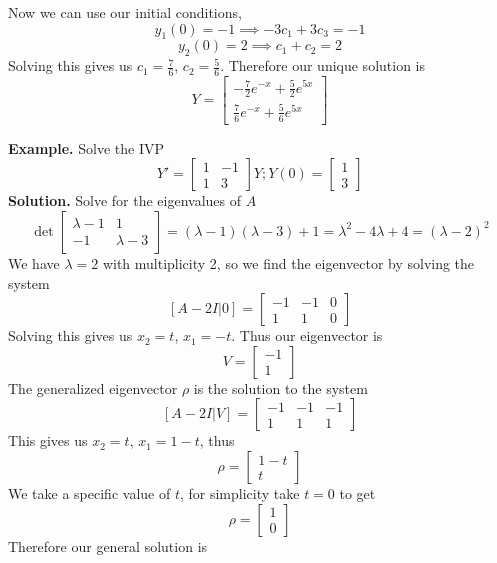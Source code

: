 \documentclass[openany]{report}
\begin{document}
Now we can use our initial conditions,
\[y_1(0) = -1 \implies -3c_1 + 3c_3 = -1\]
\[y_2(0) = 2 \implies c_1 + c_2 = 2\]
Solving this gives us $c_1 = \frac{7}{6}$, $c_2 = \frac{5}{6}$. Therefore our unique solution is
\[Y = \begin{bmatrix}
    -\frac{7}{2}e^{-x} + \frac{5}{2}e^{5x}\\
    \frac{7}{6}e^{-x} + \frac{5}{6}e^{5x}
\end{bmatrix}\]

\textbf{Example.} Solve the IVP 
\[Y' = \begin{bmatrix}
    1 & - 1\\
    1 & 3
\end{bmatrix}Y; Y(0) = \begin{bmatrix}
    1\\
    3
\end{bmatrix}\]
\textbf{Solution.} Solve for the eigenvalues of $A$ 
\[\det\begin{bmatrix}
    \lambda - 1 & 1\\
    -1 & \lambda - 3
    \end{bmatrix} = (\lambda - 1)(\lambda - 3) + 1 = \lambda^2 - 4\lambda + 4 = (\lambda - 2)^2\]
We have $\lambda = 2$ with multiplicity 2, so we find the eigenvector by solving the system
\[[A - 2I|0] = \begin{bmatrix}
    -1 & -1 & 0\\
    1 & 1 & 0
\end{bmatrix}\]
Solving this gives us $x_2 = t$, $x_1 = -t$. Thus our eigenvector is
\[V = \begin{bmatrix}
    -1\\
    1
\end{bmatrix}\]
The generalized eigenvector $\rho$ is the solution to the system
\[[A - 2I | V] = \begin{bmatrix}
    -1 & -1 & -1\\
    1 & 1 & 1
\end{bmatrix}\]
This gives us $x_2 = t$, $x_1 = 1 -t$, thus 
\[\rho = \begin{bmatrix}
    1 - t\\
    t
\end{bmatrix}\]
We take a specific value of $t$, for simplicity take $t = 0$ to get 
\[\rho = \begin{bmatrix}
    1\\
    0
\end{bmatrix}\]
Therefore our general solution is
\end{document}
